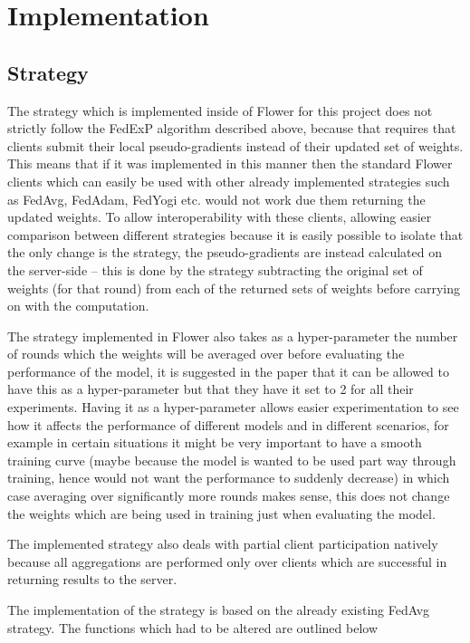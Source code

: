 \documentclass{article}
\begin{document}
\section{Implementation}

\subsection{Strategy}

The strategy which is implemented inside of Flower for this project does not strictly follow the FedExP algorithm described above, because that requires that clients submit their local pseudo-gradients instead of their updated set of weights.  This means that if it was implemented in this manner then the standard Flower clients which can easily be used with other already implemented strategies such as FedAvg, FedAdam, FedYogi etc. would not work due them returning the updated weights.  To allow interoperability with these clients, allowing easier comparison between different strategies because it is easily possible to isolate that the only change is the strategy, the pseudo-gradients are instead calculated on the server-side -- this is done by the strategy subtracting the original set of weights (for that round) from each of the returned sets of weights before carrying on with the computation.

The strategy implemented in Flower also takes as a hyper-parameter the number of rounds which the weights will be averaged over before evaluating the performance of the model, it is suggested in the paper that it can be allowed to have this as a hyper-parameter but that they have it set to 2 for all their experiments.  Having it as a hyper-parameter allows easier experimentation to see how it affects the performance of different models and in different scenarios, for example in certain situations it might be very important to have a smooth training curve (maybe because the model is wanted to be used part way through training, hence would not want the performance to suddenly decrease) in which case averaging over significantly more rounds makes sense, this does not change the weights which are being used in training just when evaluating the model.

The implemented strategy also deals with partial client participation natively because all aggregations are performed only over clients which are successful in returning results to the server.  

The implementation of the strategy is based on the already existing FedAvg strategy.  The functions which had to be altered are outlined below
\end{document}
